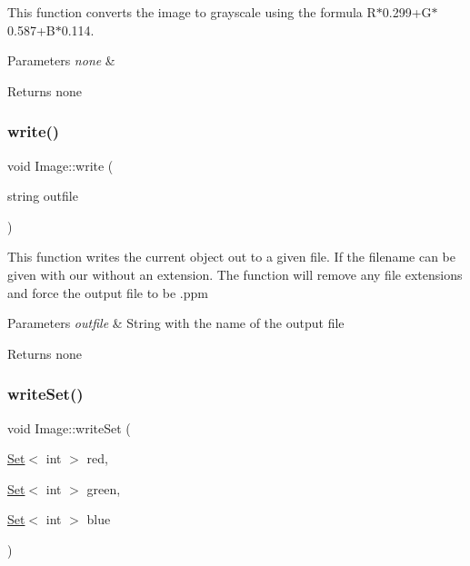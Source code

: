 This function converts the image to grayscale using the formula R$\ast$0.299+\+G$\ast$0.587+\+B$\ast$0.114.


\begin{DoxyParams}{Parameters}
{\em none} & \\
\hline
\end{DoxyParams}
\begin{DoxyReturn}{Returns}
none 
\end{DoxyReturn}
\mbox{\label{class_image_addd74434babf60a45c1d7b9fc155723a}} 
\subsubsection{\texorpdfstring{write()}{write()}}
{\footnotesize\ttfamily void Image\+::write (\begin{DoxyParamCaption}\item[{string}]{outfile }\end{DoxyParamCaption})}

This function writes the current object out to a given file. If the filename can be given with our without an extension. The function will remove any file extensions and force the output file to be .ppm


\begin{DoxyParams}{Parameters}
{\em outfile} & String with the name of the output file \\
\hline
\end{DoxyParams}
\begin{DoxyReturn}{Returns}
none 
\end{DoxyReturn}
\mbox{\label{class_image_aeb66578047d02ea0d9a91d804a08b61e}} 
\subsubsection{\texorpdfstring{write\+Set()}{writeSet()}}
{\footnotesize\ttfamily void Image\+::write\+Set (\begin{DoxyParamCaption}\item[{\hyperlink{class_set}{Set}$<$ int $>$}]{red,  }\item[{\hyperlink{class_set}{Set}$<$ int $>$}]{green,  }\item[{\hyperlink{class_set}{Set}$<$ int $>$}]{blue }\end{DoxyParamCaption})}

